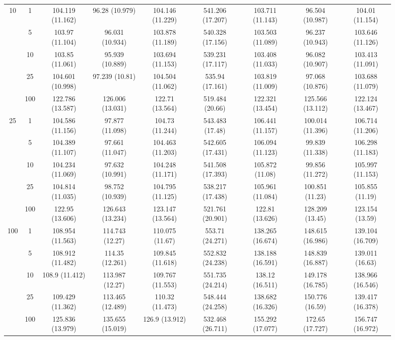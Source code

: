 \documentclass[10pt]{article}
\theoremstyle{definition}
\begin{document}
\begin{sidewaysfigure}
\begin{tabular}{cc|ccc|cccc}
  \multirow{5}{*}{10} & 1 & 104.119 (11.162) & 96.28 (10.979) & 104.146 (11.229) & 541.206 (17.207) & 103.711 (11.143) & 96.504 (10.987) & 104.01 (11.154) \\ 
 & 5 & 103.97 (11.104) & 96.031 (10.934) & 103.878 (11.189) & 540.328 (17.156) & 103.503 (11.089) & 96.237 (10.943) & 103.646 (11.126) \\ 
 & 10 & 103.85 (11.061) & 95.939 (10.889) & 103.694 (11.153) & 539.231 (17.117) & 103.408 (11.033) & 96.082 (10.907) & 103.413 (11.091) \\ 
 & 25 & 104.601 (10.998) & 97.239 (10.81) & 104.504 (11.062) & 535.94 (17.161) & 103.819 (11.009) & 97.068 (10.876) & 103.688 (11.079) \\ 
 & 100 & 122.786 (13.587) & 126.006 (13.031) & 122.71 (13.564) & 519.484 (20.66) & 122.321 (13.454) & 125.566 (13.112) & 122.124 (13.467) \\[.3cm]  
 \multirow{5}{*}{25} & 1 & 104.586 (11.156) & 97.877 (11.098) & 104.73 (11.244) & 543.483 (17.48) & 106.441 (11.157) & 100.014 (11.396) & 106.714 (11.206) \\ 
  & 5 & 104.389 (11.107) & 97.661 (11.047) & 104.463 (11.203) & 542.605 (17.431) & 106.094 (11.123) & 99.839 (11.338) & 106.298 (11.183) \\ 
  & 10 & 104.234 (11.069) & 97.632 (10.991) & 104.248 (11.171) & 541.508 (17.393) & 105.872 (11.08) & 99.856 (11.272) & 105.997 (11.153) \\ 
  & 25 & 104.814 (11.035) & 98.752 (10.939) & 104.795 (11.125) & 538.217 (17.438) & 105.961 (11.084) & 100.851 (11.23) & 105.855 (11.19) \\ 
  & 100 & 122.95 (13.606) & 126.643 (13.234) & 123.147 (13.564) & 521.761 (20.901) & 122.81 (13.626) & 128.209 (13.45) & 123.154 (13.59) \\[.3cm]  
  \multirow{5}{*}{100} & 1 & 108.954 (11.563) & 114.743 (12.27) & 110.075 (11.67) & 553.71 (24.271) & 138.265 (16.674) & 148.615 (16.986) & 139.104 (16.709) \\ 
  & 5 & 108.912 (11.482) & 114.35 (12.261) & 109.845 (11.618) & 552.832 (24.238) & 138.188 (16.591) & 148.839 (16.887) & 139.011 (16.63) \\ 
  & 10 & 108.9 (11.412) & 113.987 (12.27) & 109.767 (11.553) & 551.735 (24.214) & 138.12 (16.511) & 149.178 (16.785) & 138.966 (16.546) \\ 
  & 25 & 109.429 (11.362) & 113.465 (12.489) & 110.32 (11.473) & 548.444 (24.258) & 138.682 (16.326) & 150.776 (16.59) & 139.417 (16.378) \\ 
  & 100 & 125.836 (13.979) & 135.655 (15.019) & 126.9 (13.912) & 532.468 (26.711) & 155.292 (17.077) & 172.65 (17.727) & 156.747 (16.972) \\ 
\end{tabular}
\end{sidewaysfigure}
\end{document}
